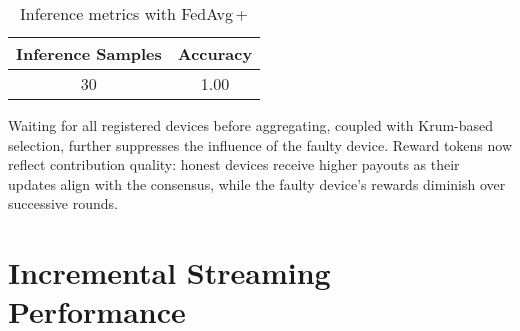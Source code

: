 \begin{table}[h!]
    \centering
    \caption{Inference metrics with FedAvg\,+}
    \label{tab:fedavg_plus_inference}
    \begin{tabular}{c c}
        \toprule
        \textbf{Inference Samples} & \textbf{Accuracy} \\
        \midrule
        30 & 1.00 \\
        \bottomrule
    \end{tabular}
\end{table}

Waiting for all registered devices before aggregating, coupled with Krum-based selection, further suppresses the influence of the faulty device. Reward tokens now reflect contribution quality: honest devices receive higher payouts as their updates align with the consensus, while the faulty device's rewards diminish over successive rounds.

\section{Incremental Streaming Performance}

